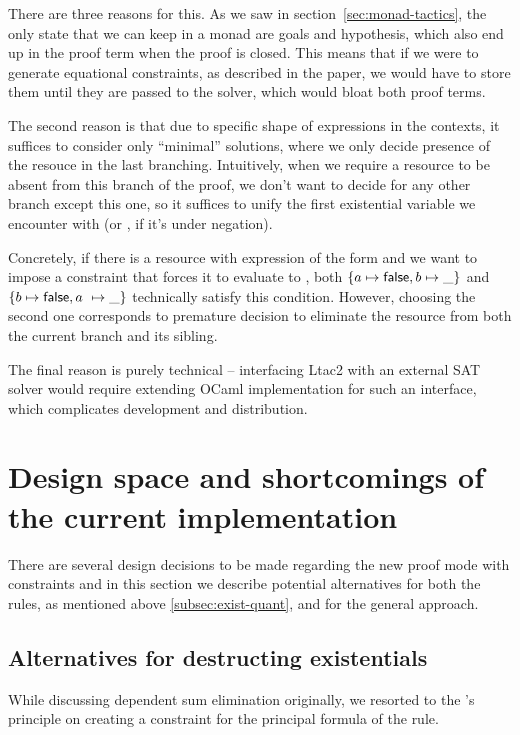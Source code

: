 There are three reasons for this.
As we saw in section~\ref{sec:monad-tactics}, the only state that we can keep in a monad are goals and hypothesis, which also end up in the proof term when the proof is closed.
This means that if we were to generate equational constraints, as described in the paper, we would have to store them until they are passed to the solver, which would bloat both proof terms.

The second reason is that due to specific shape of expressions in the contexts, it suffices to consider only ``minimal'' solutions, where we only decide presence of the resouce in the last branching.
Intuitively, when we require a resource to be absent from this branch of the proof, we don't want to decide for any other branch except this one, so it suffices to unify the first existential variable we encounter with \false (or \true, if it's under negation).

Concretely, if there is a resource with expression of the form  and we want to impose a constraint that forces it to evaluate to \false, both \(\left\{a \mapsto \textsf{false}, b \mapsto \_\right\} \) and \(\left\{b \mapsto \textsf{false}, a\ \mapsto \_\right\}\) technically satisfy this condition.
However, choosing the second one corresponds to premature decision to eliminate the resource from both the current branch and its sibling.

The final reason is purely technical -- interfacing Ltac2 with an external SAT solver would require extending OCaml implementation for such an interface, which complicates development and distribution.

\section{Design space and shortcomings of the current implementation}
\label{sec:poss-designs-comp}

There are several design decisions to be made regarding the new proof mode with constraints and in this section we describe potential alternatives for both the rules, as mentioned above \ref{subsec:exist-quant}, and for the general approach.

\subsection{Alternatives for destructing existentials}
\label{subsec:design_decisions_existential}

While discussing dependent sum elimination originally, we resorted to the \citeauthor{harlandResourceDistributionBooleanConstraints2003}'s principle on creating a constraint for the principal formula of the rule.

